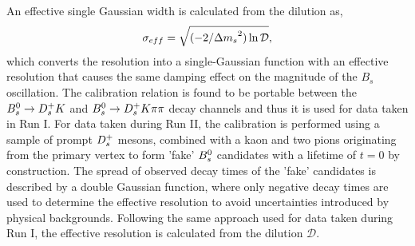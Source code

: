 An effective single Gaussian width is calculated from the dilution as,
\begin{equation}
\sigma_{eff} = \sqrt{(-2/{\Delta m_{{s}}}^{2})\ln{\mathcal{D}}},
\label{eq:effres}
\end{equation}
which converts the resolution into a single-Gaussian function with an effective resolution that causes the same damping effect on the magnitude of the $B_s$ oscillation.
The calibration relation is found to be portable between the ${{B}^0_{s}}\rightarrow{\ensuremath{{D}^+_{s}}}{\ensuremath{K}}$ and ${{B}^0_{s}}\rightarrow{\ensuremath{{D}^+_{s}}}{\ensuremath{K}}{\ensuremath{\pi}}{\ensuremath{\pi}}$ decay channels and thus it is used for data taken in Run I.\newline
For data taken during Run II, the calibration is performed using a sample of prompt ${{D}^+_{s}}$ mesons, 
combined with a kaon and two pions originating from the primary vertex to form 'fake' ${{B}^0_{s}}$ candidates with a lifetime of $t = 0$ by construction. 
The spread of observed decay times of the 'fake' candidates is described by a double Gaussian function, 
where only negative decay times are used to determine the effective resolution to avoid uncertainties introduced by physical backgrounds. 
Following the same approach used for data taken during Run I, the effective resolution is calculated from the dilution $\mathcal{D}$. 

